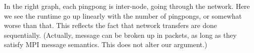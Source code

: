 In the right graph, each pingpong is inter-node, going through the network.
Here we see the runtime go up linearly with the number of pingpongs,
or somewhat worse than that.
This reflects the fact that network transfers are done sequentially.
(Actually, message can be broken up in packets, as long as they
satisfy MPI message semantics. This does not alter our argument.)

\begin{comment}
  \begin{figure}
    \begin{tikzpicture}  
      \begin{axis}
        [  
          xlabel={\#cores per node},
          ylabel={msec},
          symbolic x coords={14,20,28,56},
          xtick=data,  ytick={0,5,10,15,20,25},
        ]  
        \addplot coordinates {(14, 19.4) (20, 20.3) (28, 20.7) (56, 25.5) };
        \legend{milliseconds per pingpong}
      \end{axis}

      \begin{axis}
        [  
          ylabel={msec},
          scale only axis,
          symbolic x coords={14,20,28,56},
          xtick=data,  ytick={0,100,200,300,400},
          axis y line*=right,
          axis x line=none,
        ]  
        \addplot coordinates {(14, 99.4) (20, 132) (28, 189) (56, 379) };
      \end{axis}
    \end{tikzpicture}  
    \caption{Timing for pingpong between nodes}
  \end{figure}
\end{comment}


